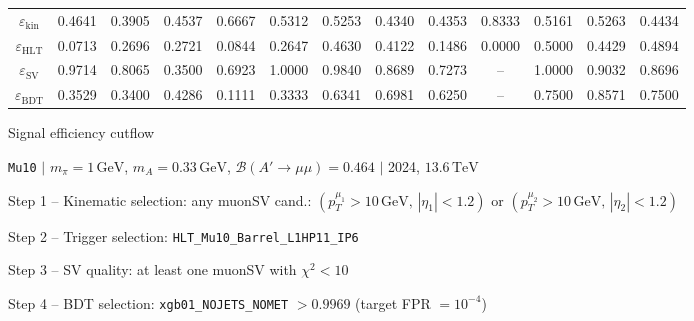 \documentclass[10pt,a4paper]{article}
\begin{document}
\begin{landscape}
{\begin{tabular}{c|cccc|cccc|cccc}
\midrule
$\varepsilon_{\mathrm{kin}}$ & 0.4641 & 0.3905 & 0.4537 & 0.6667 & 0.5312 & 0.5253 & 0.4340 & 0.4353 & 0.8333 & 0.5161 & 0.5263 & 0.4434\\
$\varepsilon_{\mathrm{HLT}}$ & 0.0713 & 0.2696 & 0.2721 & 0.0844 & 0.2647 & 0.4630 & 0.4122 & 0.1486 & 0.0000 & 0.5000 & 0.4429 & 0.4894\\
$\varepsilon_{\mathrm{SV}}$ & 0.9714 & 0.8065 & 0.3500 & 0.6923 & 1.0000 & 0.9840 & 0.8689 & 0.7273 & -- & 1.0000 & 0.9032 & 0.8696\\
$\varepsilon_{\mathrm{BDT}}$ & 0.3529 & 0.3400 & 0.4286 & 0.1111 & 0.3333 & 0.6341 & 0.6981 & 0.6250 & -- & 0.7500 & 0.8571 & 0.7500\\
\bottomrule
\end{tabular}}

\end{landscape}
\clearpage

{\large Signal efficiency cutflow

 \texttt{Mu10} $|$ $m_{\pi}=1\,\mathrm{GeV}$, $m_{A}=0.33\,\mathrm{GeV}$, $\mathcal{B}(A'\!\to\!\mu\mu)=0.464$ $|$ 2024, $13.6\,\mathrm{TeV}$}

\vspace{0.8em}

Step 1 -- Kinematic selection: any muonSV cand.: $(p_T^{\mu_1}{>}10\,\mathrm{GeV},\,|\eta_1|{<}1.2)$ or $(p_T^{\mu_2}{>}10\,\mathrm{GeV},\,|\eta_2|{<}1.2)$

Step 2 -- Trigger selection: \texttt{HLT\_Mu10\_Barrel\_L1HP11\_IP6}

Step 3 -- SV quality: at least one muonSV with $\chi^2<10$

Step 4 -- BDT selection: \texttt{xgb01\_NOJETS\_NOMET} $>0.9969$ (target FPR $=10^{-4}$)

\vspace{0.8em}
\end{document}
